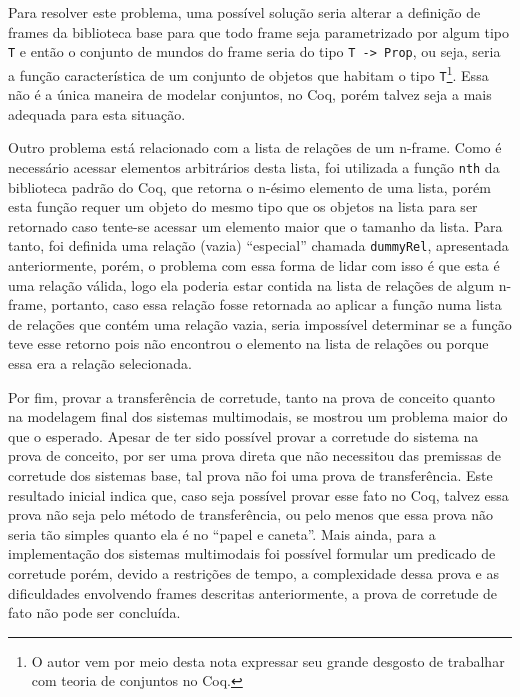       Para resolver este problema, uma possível solução seria alterar a definição de frames da biblioteca base para que todo frame seja parametrizado por algum tipo
      \texttt{T} e então o conjunto de mundos do frame seria do tipo \texttt{T -> Prop}, ou seja, seria a função característica de um conjunto de objetos que
      habitam o tipo \texttt{T}\footnote{O autor vem por meio desta nota expressar seu grande desgosto de trabalhar com teoria de conjuntos no Coq.}.
      Essa não é a única maneira de modelar conjuntos, no Coq, porém talvez seja a mais adequada para esta situação.

      Outro problema está relacionado com a lista de relações de um n-frame. Como é necessário acessar elementos arbitrários desta lista, foi utilizada a função
      \texttt{nth} da biblioteca padrão do Coq, que retorna o n-ésimo elemento de uma lista, porém esta função requer um objeto do mesmo tipo que os objetos na
      lista para ser retornado caso tente-se acessar um elemento maior que o tamanho da lista. Para tanto, foi definida uma relação (vazia) ``especial'' chamada \texttt{dummyRel},
      apresentada anteriormente, porém, o problema com essa forma de lidar com isso é que esta é uma relação válida, logo ela poderia estar contida na lista de relações de algum
      n-frame, portanto, caso essa relação fosse retornada ao aplicar a função numa lista de relações que contém uma relação vazia, seria impossível determinar se a função
      teve esse retorno pois não encontrou o elemento na lista de relações ou porque essa era a relação selecionada.

      Por fim, provar a transferência de corretude, tanto na prova de conceito quanto na modelagem final dos sistemas multimodais, se mostrou um problema maior
      do que o esperado. Apesar de ter sido possível provar a corretude do sistema \SisT na prova de conceito, por ser uma prova direta que não necessitou das premissas
      de corretude dos sistemas base, tal prova não foi uma prova de transferência. Este resultado inicial indica que, caso seja possível provar esse fato no Coq,
      talvez essa prova não seja pelo método de transferência, ou pelo menos que essa prova não seria tão simples quanto ela é no ``papel e caneta''.
      Mais ainda, para a implementação dos sistemas multimodais foi possível formular um predicado de corretude
      porém, devido a restrições de tempo, a complexidade dessa prova e as dificuldades envolvendo frames descritas anteriormente, a prova de corretude de fato não pode ser concluída.